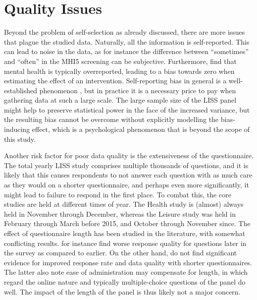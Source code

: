\section{Quality Issues}
\label{sec:data:quality}
Beyond the problem of self-selection as already discussed, there are more issues that plague the studied data.
Naturally, all the information is self-reported. This can lead to noise in the data, as for instance the difference
between ``sometimes'' and ``often'' in the MHI5 screening can be subjective. Furthermore,  find that
mental health is typically overreported, leading to a bias towards zero when estimating the effect of an intervention.
Self-reporting bias in general is a well-established phenomenon \cite{rosenman2011measuring}, but in practice it is a
necessary price to pay when gathering data at such a large scale. The large sample size of the LISS panel might
help to preserve statistical power in the face of the increased variance, but the resulting bias cannot be overcome
without explicitly modelling the bias-inducing effect, which is a psychological phenomenon that is beyond the scope of this study.

Another risk factor for poor data quality is the extensiveness of the questionnaire. The total yearly LISS study
comprises multiple thousands of questions, and it is likely that this causes respondents to not answer each question
with as much care as they would on a shorter questionnaire, and perhaps even more significantly, it might lead to
failure to respond in the first place.
To combat this, the core studies are held at different times of year. The Health study is (almost) always held in November
through December, whereas the Leisure study was held in February through March before 2015, and October through November since.
The effect of questionnaire length has been studied in the literature, with somewhat conflicting results.  for instance
find worse response quality for questions later in the survey as compared to earlier. On the other hand, 
do not find significant evidence for improved response rate and data quality with shorter questionnaires. The latter
also note ease of administration may compensate for length, in which regard the online nature and typically multiple-choice
questions of the panel do well. The impact of the length of the panel is thus likely not a major concern.

